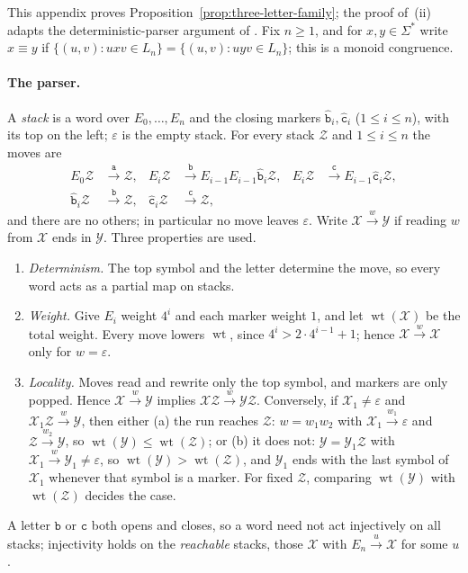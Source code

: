 \documentclass[11pt]{article}
\numberwithin{equation}{section}
\theoremstyle{plain}
\theoremstyle{definition}
\theoremstyle{remark}
\newcommand{\eps}{\varepsilon}
\theoremstyle{plain}
\begin{document}
This appendix proves Proposition~\ref{prop:three-letter-family}; the proof of~(ii)
adapts the deterministic-parser argument of \cite[Appendix~C]{kuriyamaCFG}.  Fix
$n\ge1$, and for $x,y\in\Sigma^*$ write $x\equiv y$ if
$\{(u,v):uxv\in L_n\}=\{(u,v):uyv\in L_n\}$; this is a monoid congruence.

\paragraph{The parser.}
A \emph{stack} is a word over $E_0,\ldots,E_n$ and the closing markers
$\hat{\mathtt b}_i,\hat{\mathtt c}_i$ ($1\le i\le n$), with its top on the left; $\eps$
is the empty stack.  For every stack $\mathcal Z$ and $1\le i\le n$ the moves are
\[
\begin{aligned}
E_0\mathcal Z&\xrightarrow{\mathtt a}\mathcal Z,&
E_i\mathcal Z&\xrightarrow{\mathtt b}E_{i-1}E_{i-1}\hat{\mathtt b}_i\mathcal Z,&
E_i\mathcal Z&\xrightarrow{\mathtt c}E_{i-1}\hat{\mathtt c}_i\mathcal Z,\\
\hat{\mathtt b}_i\mathcal Z&\xrightarrow{\mathtt b}\mathcal Z,&
\hat{\mathtt c}_i\mathcal Z&\xrightarrow{\mathtt c}\mathcal Z,
\end{aligned}
\]
and there are no others; in particular no move leaves $\eps$.  Write
$\mathcal X\xrightarrow{w}\mathcal Y$ if reading $w$ from $\mathcal X$ ends in
$\mathcal Y$.  Three properties are used.
\begin{enumerate}[label=\textup{(D\arabic*)},leftmargin=2.6em]
\item \emph{Determinism.} The top symbol and the letter determine the move, so
every word acts as a partial map on stacks.
\item \emph{Weight.} Give $E_i$ weight $4^i$ and each marker weight $1$, and let
$\operatorname{wt}(\mathcal X)$ be the total weight.  Every move lowers
$\operatorname{wt}$, since $4^i>2\cdot4^{i-1}+1$; hence
$\mathcal X\xrightarrow{w}\mathcal X$ only for $w=\eps$.
\item \emph{Locality.} Moves read and rewrite only the top symbol, and markers
are only popped.  Hence $\mathcal X\xrightarrow{w}\mathcal Y$ implies
$\mathcal X\mathcal Z\xrightarrow{w}\mathcal Y\mathcal Z$.  Conversely, if
$\mathcal X_1\ne\eps$ and $\mathcal X_1\mathcal Z\xrightarrow{w}\mathcal Y$, then either
\textup{(a)} the run reaches $\mathcal Z$: $w=w_1w_2$ with
$\mathcal X_1\xrightarrow{w_1}\eps$ and $\mathcal Z\xrightarrow{w_2}\mathcal Y$, so
$\operatorname{wt}(\mathcal Y)\le\operatorname{wt}(\mathcal Z)$; or \textup{(b)} it
does not: $\mathcal Y=\mathcal Y_1\mathcal Z$ with $\mathcal X_1\xrightarrow{w}\mathcal Y_1\ne\eps$,
so $\operatorname{wt}(\mathcal Y)>\operatorname{wt}(\mathcal Z)$, and $\mathcal Y_1$ ends
with the last symbol of $\mathcal X_1$ whenever that symbol is a marker.  For
fixed $\mathcal Z$, comparing $\operatorname{wt}(\mathcal Y)$ with
$\operatorname{wt}(\mathcal Z)$ decides the case.
\end{enumerate}
A letter $\mathtt b$ or $\mathtt c$ both opens and closes, so a word need not act
injectively on all stacks; injectivity holds on the \emph{reachable} stacks,
those $\mathcal X$ with $E_n\xrightarrow{u}\mathcal X$ for some $u$.
\end{document}
